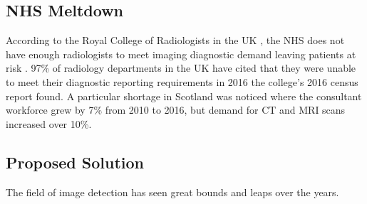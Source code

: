 \documentclass{report}
\begin{document}
\subsection{NHS Meltdown}
 According to the Royal College of Radiologists in the UK , the NHS does not have enough radiologists to meet imaging diagnostic demand leaving patients at risk \cite{rimmer2017radiologist}. 97\% of radiology departments in the UK have cited that they were unable to meet their diagnostic reporting requirements in 2016 the college's 2016 census report found. A particular shortage in Scotland was noticed where the consultant workforce grew by 7\% from 2010 to 2016, but demand for CT and MRI scans increased over 10\%.
\subsection{Proposed Solution}
The field of image detection has seen great bounds and leaps over the years. 
\fi



	

	 
\end{document}
